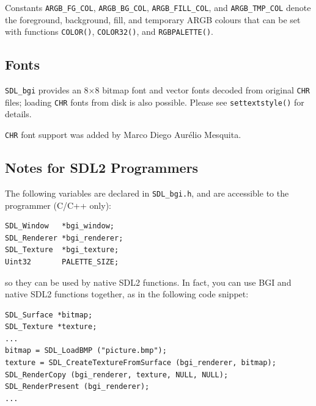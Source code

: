 \documentclass[a4paper,12pt]{article}
\newcommand{\ntt}[1]{\texttt{#1}}
\newcommand{\fn}[1]{\ntt{#1}}        %
\newcommand{\F}[1]{\ntt{#1}}         %
\newcommand{\T}[1]{\ntt{#1}}         %
\newcommand{\SDLbgi}{\texttt{SDL\_bgi}}
\begin{document}
Constants \T{ARGB\_FG\_COL}, \T{ARGB\_BG\_COL}, \T{ARGB\_FILL\_COL},
and \T{ARGB\_TMP\_COL} denote the fo\-reground, background, fill, and
temporary ARGB colours that can be set with functions \fn{COLOR()},
\fn{COLOR32()}, and \fn{RGBPALETTE()}.


\subsection{Fonts}

\SDLbgi{} provides an 8$\times$8 bitmap font and vector fonts decoded
from original \T{CHR} files; loading \T{CHR} fonts from disk is also
possible. Please see \fn{settextstyle()} for details.

\T{CHR} font support was added by Marco Diego Aur\'elio Mesquita.


\subsection{Notes for SDL2 Programmers}

The following variables are declared in \F{SDL\_bgi.h}, and are
accessible to the programmer (C/C++ only):

\begin{small}
\begin{spacing}{0.85}
\begin{verbatim}
SDL_Window   *bgi_window;
SDL_Renderer *bgi_renderer;
SDL_Texture  *bgi_texture;
Uint32       PALETTE_SIZE;
\end{verbatim}
\end{spacing}
\end{small}

so they can be used by native SDL2 functions. In fact, you can use BGI
and native SDL2 functions together, as in the following code snippet:

\begin{small}
\begin{spacing}{0.85}
\begin{verbatim}
SDL_Surface *bitmap;
SDL_Texture *texture;
...
bitmap = SDL_LoadBMP ("picture.bmp");
texture = SDL_CreateTextureFromSurface (bgi_renderer, bitmap);
SDL_RenderCopy (bgi_renderer, texture, NULL, NULL);
SDL_RenderPresent (bgi_renderer);
...
\end{verbatim}
\end{spacing}
\end{small}
\end{document}
